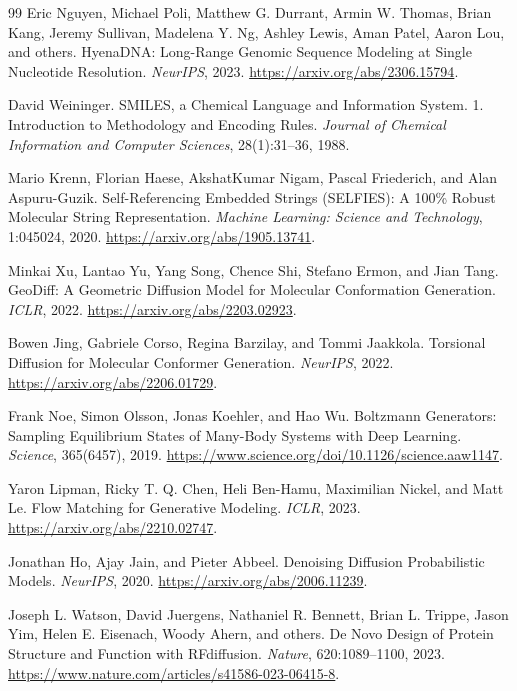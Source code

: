 \documentclass[11pt]{article}
\begin{document}
\begin{thebibliography}{99}
Eric Nguyen, Michael Poli, Matthew G. Durrant, Armin W. Thomas, Brian Kang, Jeremy Sullivan, Madelena Y. Ng, Ashley Lewis, Aman Patel, Aaron Lou, and others.
\newblock HyenaDNA: Long-Range Genomic Sequence Modeling at Single Nucleotide Resolution.
\newblock \emph{NeurIPS}, 2023.
\newblock \url{https://arxiv.org/abs/2306.15794}.

David Weininger.
\newblock SMILES, a Chemical Language and Information System. 1. Introduction to Methodology and Encoding Rules.
\newblock \emph{Journal of Chemical Information and Computer Sciences}, 28(1):31--36, 1988.

Mario Krenn, Florian Haese, AkshatKumar Nigam, Pascal Friederich, and Alan Aspuru-Guzik.
\newblock Self-Referencing Embedded Strings (SELFIES): A 100\% Robust Molecular String Representation.
\newblock \emph{Machine Learning: Science and Technology}, 1:045024, 2020.
\newblock \url{https://arxiv.org/abs/1905.13741}.

Minkai Xu, Lantao Yu, Yang Song, Chence Shi, Stefano Ermon, and Jian Tang.
\newblock GeoDiff: A Geometric Diffusion Model for Molecular Conformation Generation.
\newblock \emph{ICLR}, 2022.
\newblock \url{https://arxiv.org/abs/2203.02923}.

Bowen Jing, Gabriele Corso, Regina Barzilay, and Tommi Jaakkola.
\newblock Torsional Diffusion for Molecular Conformer Generation.
\newblock \emph{NeurIPS}, 2022.
\newblock \url{https://arxiv.org/abs/2206.01729}.

Frank Noe, Simon Olsson, Jonas Koehler, and Hao Wu.
\newblock Boltzmann Generators: Sampling Equilibrium States of Many-Body Systems with Deep Learning.
\newblock \emph{Science}, 365(6457), 2019.
\newblock \url{https://www.science.org/doi/10.1126/science.aaw1147}.

Yaron Lipman, Ricky T. Q. Chen, Heli Ben-Hamu, Maximilian Nickel, and Matt Le.
\newblock Flow Matching for Generative Modeling.
\newblock \emph{ICLR}, 2023.
\newblock \url{https://arxiv.org/abs/2210.02747}.

Jonathan Ho, Ajay Jain, and Pieter Abbeel.
\newblock Denoising Diffusion Probabilistic Models.
\newblock \emph{NeurIPS}, 2020.
\newblock \url{https://arxiv.org/abs/2006.11239}.

Joseph L. Watson, David Juergens, Nathaniel R. Bennett, Brian L. Trippe, Jason Yim, Helen E. Eisenach, Woody Ahern, and others.
\newblock De Novo Design of Protein Structure and Function with RFdiffusion.
\newblock \emph{Nature}, 620:1089--1100, 2023.
\newblock \url{https://www.nature.com/articles/s41586-023-06415-8}.


\end{thebibliography}
\end{document}

